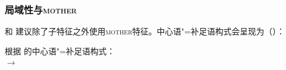 \subsubsection{局域性与\textsc{mother}}
\label{sec-mother}

\mbox{} \citet*[475--489]{SWB2003a}和 \citet{Sag2007a,Sag2012a}建议除了子特征之外使用\textsc{mother}特征。中心语"=补足语构式会呈现为（）：

\eas
根据 \citet*[481]{SWB2003a}的中心语"=补足语构式：\\
 $\to$\\
\zs


